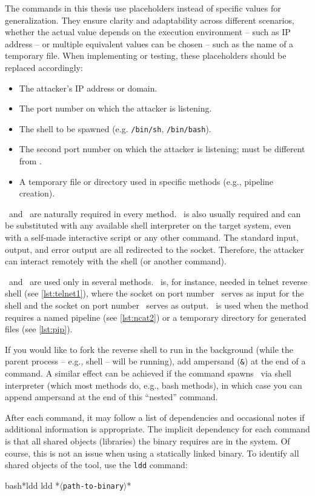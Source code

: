 The commands in this thesis use placeholders instead of specific values for generalization. They ensure clarity and adaptability across different scenarios, whether the actual value depends on the execution environment -- such as IP address -- or multiple equivalent values can be chosen -- such as the name of a temporary file. When implementing or testing, these placeholders should be replaced accordingly:

\setlength{\leftmargini}{5em}
\begin{itemize}
\item[\host] The attacker's IP address or domain.
\item[\port] The port number on which the attacker is listening.
\item[\shell] The shell to be spawned (e.g. \texttt{/bin/sh}, \texttt{/bin/bash}).
\item[\portt] The second port number on which the attacker is listening; must be different from \port.
\item[\tmp] A temporary file or directory used in specific methods (e.g., pipeline creation).
\end{itemize}
\setlength{\leftmargini}{2.5em}

\host\ and \port\ are naturally required in every method. \shell\ is also usually required and can be substituted with any available shell interpreter on the target system, even with a self-made interactive script or any other command. The standard input, output, and error output are all redirected to the socket. Therefore, the attacker can interact remotely with the shell (or another command).

\portt\ and \tmp\ are used only in several methods. \portt\ is, for instance, needed in telnet reverse shell (see \cref{lst:telnet1}), where the socket on port number \port\ serves as input for the shell and the socket on port number \portt\ serves as output. \tmp\ is used when the method requires a named pipeline (see \cref{lst:ncat2}) or a temporary directory for generated files (see \cref{lst:pip}).

If you would like to fork the reverse shell to run in the background (while the parent process -- e.g., shell -- will be running), add ampersand (\texttt{\&}) at the end of a command. A similar effect can be achieved if the command spawns \shell\ via shell interpreter (which most methods do, e.g., bash methods), in which case you can append ampersand at the end of this ``nested'' command.

After each command, it may follow a list of dependencies and occasional notes if additional information is appropriate. The implicit dependency for each command is that all shared objects (libraries) the binary requires are in the system. Of course, this is not an issue when using a statically linked binary. To identify all shared objects of the tool, use the \texttt{ldd} command:
\begin{cmdline}{bash}{*}{ldd}{}
ldd *\textcolor{placeholder}{\texttt{$\langle$path-to-binary$\rangle$}}*
\end{cmdline}

